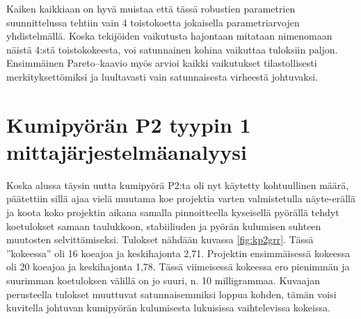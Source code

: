 \documentclass[12pt,a4paper,finnish]{tutthesis}
\begin{document}
Kaiken kaikkiaan on hyvä muistaa että tässä robustien parametrien suunnittelussa tehtiin vain 4 toistokoetta jokaisella parametriarvojen yhdistelmällä.
Koska tekijöiden vaikutusta hajontaan mitataan nimenomaan näistä 4:stä toistokokeesta,
voi satunnainen kohina vaikuttaa tuloksiin paljon.
Ensimmäinen Pareto–kaavio myös arvioi kaikki vaikutukset tilastollisesti merkityksettömiksi
ja luultavasti vain satunnaisesta virheestä johtuvaksi.

\section{Kumipyörän P2 tyypin 1 mittajärjestelmäanalyysi}

Koska alussa täysin uutta kumipyörä P2:ta oli nyt käytetty kohtuullinen määrä, päätettiin sillä ajaa vielä muutama koe projektia varten valmistetulla näyte-erällä ja koota koko projektin aikana samalla pinnoitteella kyseisellä pyörällä tehdyt koetulokset samaan taulukkoon, stabiiliuden ja pyörän kulumisen suhteen muutosten selvittämiseksi. Tulokset nähdään kuvassa \ref{fig:kp2grr}.
Tässä ”kokeessa” oli 16 koeajoa ja keskihajonta 2,71. Projektin ensimmäisessä kokeessa oli 20 koeajoa ja keskihajonta 1,78. Tässä viimeisessä kokeessa ero pienimmän ja suurimman koetuloksen välillä on jo suuri, n. 10 milligrammaa. Kuvaajan perusteella tulokset
muuttuvat
satunnaisemmiksi loppua kohden, tämän voisi kuvitella johtuvan kumipyörän kulumisesta lukuisissa vaihtelevissa kokeissa.
\end{document}
